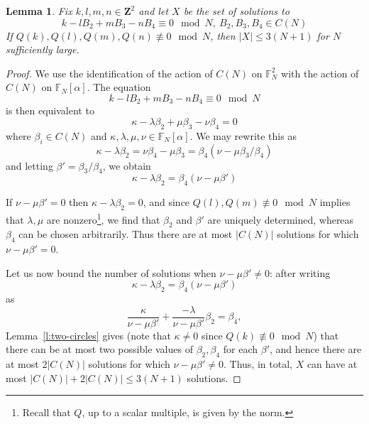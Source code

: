 \documentclass[12pt]{amsart}
\newtheorem{lem}[thm]{Lemma}%
\theoremstyle{plain}
\newcommand{\Z}{{\mathbf Z}}
\newcommand{\unit}{\alpha}
\newcommand{\curve}{X} %
\newcommand{\torus}{C(N)} %
\renewcommand{\^}{\widehat}
\begin{document}
\begin{lem}
\label{lem:why-curve}
Fix $k,l,m,n \in \Z^2$ and let $\curve$ be the set of solutions to 
$$
k-l B_2 + mB_3-n B_4 \equiv 0 \mod N, \ B_2,B_3,B_4 \in \torus
$$
If $Q(k), Q(l),Q(m),Q(n) \not \equiv 0 \mod N$, 
then $|\curve| \leq 3 (N+1)$ for $N$ sufficiently large.
\end{lem}

\begin{proof}
We use the identification of the action of $\torus$ on $\mathbb{F}_N^2$ with
the action of $\torus$ on $\mathbb{F}_N[\unit]$. 
%
The equation 
$$
k-l B_2 + mB_3-n B_4 \equiv 0 \mod N
$$
is then equivalent to
$$
\kappa - \lambda \beta_2 + \mu \beta_3 - \nu \beta_4 = 0
$$
where $\beta_i \in \torus$ and $\kappa,\lambda,\mu,\nu \in
\mathbb{F}_N[\unit]$.
We may rewrite this as 
$$
\kappa - \lambda \beta_2  =    \nu \beta_4 - \mu \beta_3=  
\beta_4 (\nu  - \mu \beta_3/\beta_4)
$$
and letting $\beta'=    \beta_3/\beta_4$, we obtain
$$
\kappa - \lambda \beta_2  =
\beta_4 (\nu  - \mu \beta') 
$$
%

If $\nu-\mu\beta'=0$ then $\kappa-\lambda\beta_2=0$, and since
$Q(l),Q(m) \not \equiv 0 \mod N$ implies that $\lambda,\mu$ are
nonzero\footnote{Recall that $Q$, up to a scalar multiple, is given by
  the norm.}, we find that $\beta_2$ and $\beta'$ are uniquely determined,
whereas $\beta_4$ can be chosen arbitrarily.  Thus there are at most
$|\torus|$ solutions for which $\nu-\mu\beta'=0$.

Let us now bound the number of solutions when $\nu-\mu\beta' \neq 0$:
after writing 
$$
\kappa - \lambda \beta_2  =
\beta_4 (\nu  - \mu \beta') 
$$
as 
$$
\frac{\kappa}{\nu  - \mu \beta'}
+ \frac{-\lambda}{\nu  - \mu \beta'} \beta_2  =
\beta_4,
$$
Lemma~\ref{l:two-circles} gives 
(note that $\kappa \neq 0$ since $Q(k) \not \equiv 0 \mod N$)
that there can be at most two
possible values of $\beta_2,\beta_4$ for each $\beta'$, and hence
there are at most $2|\torus|$ solutions for which $\nu-\mu\beta' \neq
0$. 
Thus, in total, $\curve$ can have at most $|\torus| + 2|\torus| \leq
3(N+1)$ solutions. 
\end{proof}
\end{document}
